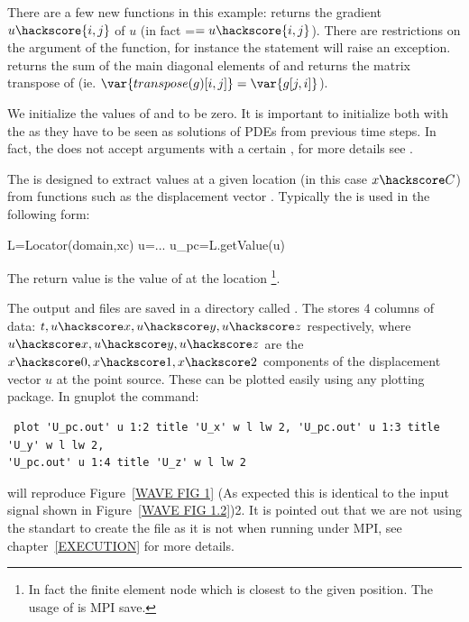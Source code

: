 There are a few new \escript functions in this example: 
 returns the gradient $u\hackscore{i,j}$ of $u$ (in fact =$=u\hackscore{i,j}$).
There are restrictions on the argument of the  function, for instance
the statement  will raise an exception.
 returns the sum of the main diagonal elements  of  
and  returns the matrix transpose of  (ie. $\var{transpose(g)[i,j]}=\var{g[j,i]}$). 

We initialize the values of  and  to be zero. It is important
to initialize both with the \SolutionFS \FunctionSpace as they have to be seen as solutions of PDEs from previous time steps. In fact, the  does not accept arguments with a certain \FunctionSpace, for more details see . 

The  is designed to extract values at a given location (in this case $x\hackscore C$) from functions such as the displacement vector . Typically the  is used in the following form:  
\begin{python}
L=Locator(domain,xc)
u=...
u_pc=L.getValue(u)
\end{python}
The return value  is the value of  at the location \footnote{In fact the finite element node which is closest to the given position. The usage of   is MPI save.}.


The output  and  files are saved in a directory called .
The  stores 4 columns of data: $t,u\hackscore x,u\hackscore y,u\hackscore z$ 
respectively, where $u\hackscore x,u\hackscore y,u\hackscore z$ are the $x\hackscore 0,x\hackscore 1,x\hackscore 2$ components of 
the displacement vector $u$ at the point source. These can be
plotted easily using any plotting package. In gnuplot the command:
\begin{verbatim}
 plot 'U_pc.out' u 1:2 title 'U_x' w l lw 2, 'U_pc.out' u 1:3 title 'U_y' w l lw 2, 
'U_pc.out' u 1:4 title 'U_z' w l lw 2
\end{verbatim}
will reproduce Figure~\ref{WAVE FIG 1} (As expected this is identical to the input signal shown in Figure~\ref{WAVE FIG 1.2})2. It is pointed out that we are not using the
standart \PYTHON {} to create the file  as it is not 
when running \escript under MPI, see chapter~\ref{EXECUTION} for more details.

